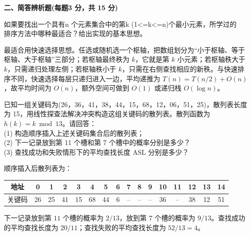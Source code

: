 \textbf{二、简答辨析题(每题3 分，共 15 分)}
\begin{question}
如果要找出一个具有n 个元素集合中的第k (1<=k<=n)个最小元素，所学过的\\
排序方法中哪种最适合？给出实现的基本思想。\\
\begin{solution}
最适合用快速选择思想。任选或随机选一个枢轴，把数组划分为“小于枢轴、等于枢轴、大于枢轴”三部分；若枢轴最终秩为 $k$，它就是第 $k$ 小元素；若枢轴秩大于 $k$，只需递归处理左侧；若枢轴秩小于 $k$，只需在右侧查找相应的新秩。与快速排序不同，快速选择每层只递归进入一边，平均递推为 $T(n)=T(n/2)+O(n)$，故平均时间为 $O(n)$，额外空间可做到 $O(1)$ 或递归栈 $O(\log n)$。
\end{solution}
\end{question}

\begin{question}
已知一组关键码为(26，36，41，38，44，15，68，12，06，51，25)，散列表长度为 15，用线性探查法解决冲突构造这组关键码的散列表。散列函数为 $h(k)=k\bmod 13$。请回答：\\
(1) 构造顺序插入上述关键码集合后的散列表；\\
(2) 下一记录放到第 11 个槽和第 7 个槽中的概率分别是多少？\\
(3) 查找成功和失败情形下的平均查找长度 ASL 分别是多少？
\begin{solution}
顺序插入后散列表为：
\begin{center}
\begin{tabular}{c|ccccccccccccccc}
地址&0&1&2&3&4&5&6&7&8&9&10&11&12&13&14\\ \hline
关键码&26&25&41&15&68&44&6&--&--&--&36&--&38&12&51
\end{tabular}
\end{center}
下一记录放到第 $11$ 个槽的概率为 $2/13$，放到第 $7$ 个槽的概率为 $9/13$。查找成功的平均查找长度为 $20/11$；查找失败的平均查找长度为 $52/13=4$。
\end{solution}
\end{question}

